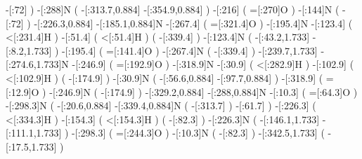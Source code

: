                  -[:72]\phantom{N}%
                      )
            -[:288]N%
                      (
        -[:313.7,0.884]%
        -[:354.9,0.884]\phantom{N}%
                      )
            -[:216]%
                      (
                =[:270]O%
                      )
            -[:144]N%
                      (
                 -[:72]%
                      )
    -[:226.3,0.884]%
    -[:185.1,0.884]N%
          -[:267.4]%
                      (
              =[:321.4]O%
                      )
          -[:195.4]N%
          -[:123.4]%
                      (
              <[:231.4]H%
                      )
           -[:51.4]%
                      (
               <[:51.4]H%
                      )
                      (
              -[:339.4]\phantom{N}%
                      )
          -[:123.4]N%
                      (
         -[:43.2,1.733]%
          -[:8.2,1.733]\phantom{N}%
                      )
          -[:195.4]%
                      (
              =[:141.4]O%
                      )
          -[:267.4]N%
                      (
              -[:339.4]%
                      )
    -[:239.7,1.733]%
    -[:274.6,1.733]N%
          -[:246.9]%
                      (
              =[:192.9]O%
                      )
          -[:318.9]N%
           -[:30.9]%
                      (
              <[:282.9]H%
                      )
          -[:102.9]%
                      (
              <[:102.9]H%
                      )
                      (
              -[:174.9]\phantom{N}%
                      )
           -[:30.9]N%
                      (
         -[:56.6,0.884]%
         -[:97.7,0.884]\phantom{N}%
                      )
          -[:318.9]%
                      (
               =[:12.9]O%
                      )
          -[:246.9]N%
                      (
              -[:174.9]%
                      )
    -[:329.2,0.884]%
      -[:288,0.884]N%
           -[:10.3]%
                      (
               =[:64.3]O%
                      )
          -[:298.3]N%
                      (
         -[:20.6,0.884]%
        -[:339.4,0.884]N%
                          (
                  -[:313.7]%
                          )
               -[:61.7]%
                      )
          -[:226.3]%
                      (
              <[:334.3]H%
                      )
          -[:154.3]%
                      (
              <[:154.3]H%
                      )
                      (
               -[:82.3]\phantom{N}%
                      )
          -[:226.3]N%
                      (
        -[:146.1,1.733]%
        -[:111.1,1.733]\phantom{N}%
                      )
          -[:298.3]%
                      (
              =[:244.3]O%
                      )
           -[:10.3]N%
                      (
               -[:82.3]%
                      )
    -[:342.5,1.733]%
                      (
         -[:17.5,1.733]\phantom{N}%
                      )